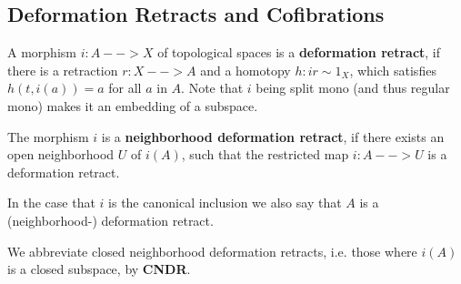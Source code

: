 	\newpage
	\subsection{Deformation Retracts and Cofibrations}

	\begin{definition}
		A morphism $i:A --> X$ of topological spaces is a \textbf{deformation retract}, if there is a retraction $r:X --> A$ and a homotopy $h:ir \sim 1_X$, which satisfies $h(t,i(a)) = a$ for all $a$ in $A$. Note that $i$ being split mono (and thus regular mono) makes it an embedding of a subspace.

		The morphism $i$ is a \textbf{neighborhood deformation retract}, if there exists an open neighborhood $U$ of $i(A)$, such that the restricted map $i:A-->U$ is a deformation retract.

		In the case that $i$ is the canonical inclusion we also say that $A$ is a (neighborhood-) deformation retract.

		We abbreviate closed neighborhood deformation retracts, i.e. those where $i(A)$ is a closed subspace, by \textbf{CNDR}.
	\end{definition}

